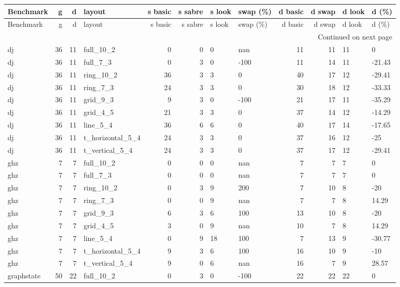 \begin{longtable}{lrrlrrllrrll}
\toprule
Benchmark & g & d & layout & s basic & s sabre & s look & swap (\%) & d basic & d swap & d look & d (\%) \\
\midrule
\endfirsthead
\toprule
Benchmark & g & d & layout & s basic & s sabre & s look & swap (\%) & d basic & d swap & d look & d (\%) \\
\midrule
\endhead
\midrule
\multicolumn{12}{r}{Continued on next page} \\
\midrule
\endfoot
\bottomrule
\endlastfoot
dj & 36 & 11 & full\_10\_2 & 0 & 0 & 0 & nan & 11 & 11 & 11 & 0 \\
dj & 36 & 11 & full\_7\_3 & 0 & 3 & 0 & -100 & 11 & 14 & 11 & -21.43 \\
dj & 36 & 11 & ring\_10\_2 & 36 & 3 & 3 & 0 & 40 & 17 & 12 & -29.41 \\
dj & 36 & 11 & ring\_7\_3 & 24 & 3 & 3 & 0 & 30 & 18 & 12 & -33.33 \\
dj & 36 & 11 & grid\_9\_3 & 9 & 3 & 0 & -100 & 21 & 17 & 11 & -35.29 \\
dj & 36 & 11 & grid\_4\_5 & 21 & 3 & 3 & 0 & 37 & 14 & 12 & -14.29 \\
dj & 36 & 11 & line\_5\_4 & 36 & 6 & 6 & 0 & 40 & 17 & 14 & -17.65 \\
dj & 36 & 11 & t\_horizontal\_5\_4 & 24 & 3 & 3 & 0 & 37 & 16 & 12 & -25 \\
dj & 36 & 11 & t\_vertical\_5\_4 & 24 & 3 & 3 & 0 & 37 & 17 & 12 & -29.41 \\
ghz & 7 & 7 & full\_10\_2 & 0 & 0 & 0 & nan & 7 & 7 & 7 & 0 \\
ghz & 7 & 7 & full\_7\_3 & 0 & 0 & 0 & nan & 7 & 7 & 7 & 0 \\
ghz & 7 & 7 & ring\_10\_2 & 0 & 3 & 9 & 200 & 7 & 10 & 8 & -20 \\
ghz & 7 & 7 & ring\_7\_3 & 0 & 0 & 9 & nan & 7 & 7 & 8 & 14.29 \\
ghz & 7 & 7 & grid\_9\_3 & 6 & 3 & 6 & 100 & 13 & 10 & 8 & -20 \\
ghz & 7 & 7 & grid\_4\_5 & 3 & 0 & 9 & nan & 10 & 7 & 8 & 14.29 \\
ghz & 7 & 7 & line\_5\_4 & 0 & 9 & 18 & 100 & 7 & 13 & 9 & -30.77 \\
ghz & 7 & 7 & t\_horizontal\_5\_4 & 9 & 3 & 6 & 100 & 16 & 10 & 9 & -10 \\
ghz & 7 & 7 & t\_vertical\_5\_4 & 9 & 0 & 6 & nan & 16 & 7 & 9 & 28.57 \\
graphstate & 50 & 22 & full\_10\_2 & 0 & 3 & 0 & -100 & 22 & 22 & 22 & 0 \\

\end{longtable}
